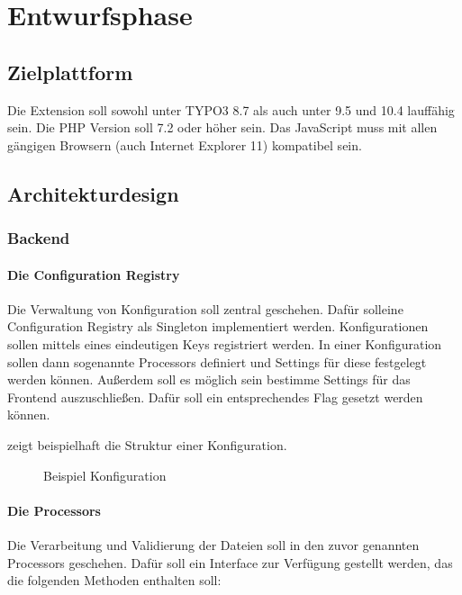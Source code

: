 \section{Entwurfsphase} 
\label{sec:Entwurfsphase}

\subsection{Zielplattform}
\label{sec:Zielplattform}

Die Extension soll sowohl unter TYPO3 8.7 als auch unter 9.5 und 10.4 lauffähig sein. Die PHP Version soll 7.2 oder höher sein. Das JavaScript muss mit allen gängigen Browsern (auch Internet Explorer 11) kompatibel sein.


\subsection{Architekturdesign}
\label{sec:Architekturdesign}

\subsubsection{Backend}
\label{sec:Backend}

\paragraph{Die Configuration Registry} Die Verwaltung von Konfiguration soll zentral geschehen. Dafür solleine Configuration Registry als Singleton implementiert werden. Konfigurationen sollen mittels eines eindeutigen Keys registriert werden. In einer Konfiguration sollen dann sogenannte Processors definiert und Settings für diese festgelegt werden können. Außerdem soll es möglich sein bestimme Settings für das Frontend auszuschließen. Dafür soll ein entsprechendes Flag gesetzt werden können. 

 zeigt beispielhaft die Struktur einer Konfiguration.
\begin{figure}[htb]
\centering
{}
\caption{Beispiel Konfiguration}
\label{fig:beispiel_konfiguration}
\end{figure}

\paragraph{Die Processors} Die Verarbeitung und Validierung der Dateien soll in den zuvor genannten Processors geschehen. Dafür soll ein Interface zur Verfügung gestellt werden, das die folgenden Methoden enthalten soll:

